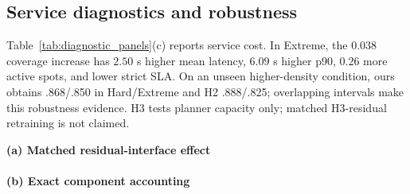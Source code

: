 \documentclass[conference]{IEEEtran}
\begin{document}
\subsection{Service diagnostics and robustness}
Table~\ref{tab:diagnostic_panels}(c) reports service cost. In Extreme, the
$0.038$ coverage increase has $2.50$ s higher mean latency, $6.09$ s higher
p90, $0.26$ more active spots, and lower strict SLA. On an unseen
higher-density condition, ours obtains .868/.850 in Hard/Extreme and H2
.888/.825; overlapping intervals make this robustness evidence. H3 tests
planner capacity only; matched H3-residual retraining is not claimed.

\begin{table}[t]
\caption{Mechanism and service evidence: (a) matched residual-interface
effect, (b) component accounting, and (c) coverage--service diagnostics.}
\label{tab:diagnostic_panels}
\centering\scriptsize
\begin{minipage}[t]{0.485\textwidth}
\centering
\textbf{(a) Matched residual-interface effect}\\[2pt]
\setlength{\tabcolsep}{1.8pt}
\\[3pt]
\textbf{(b) Exact component accounting}\\[2pt]
\setlength{\tabcolsep}{1.7pt}
\end{minipage}
\end{table}
\end{document}
